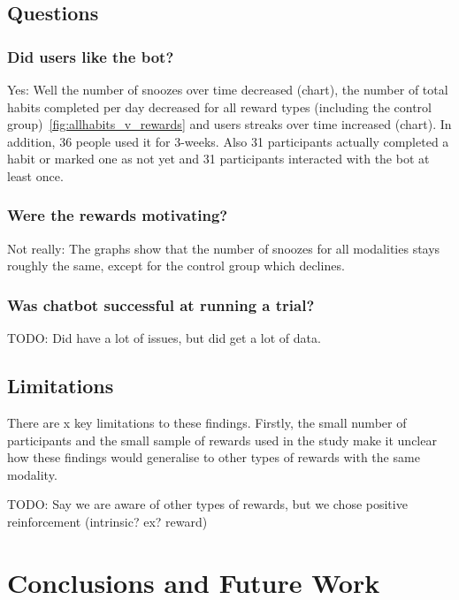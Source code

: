 \documentclass{scaffold/sigchi}
\begin{document}
\subsection{Questions}
\subsubsection{Did users like the bot?}
Yes: Well the number of snoozes over time decreased (chart), the number of total habits completed per day decreased for all reward types (including the control group)~\ref{fig:allhabits_v_rewards} and users streaks over time increased (chart). In addition, 36 people used it for 3-weeks. Also 31 participants actually completed a habit or marked one as not yet and 31 participants interacted with the bot at least once.




\subsubsection{Were the rewards motivating?}
Not really: The graphs show that the number of snoozes for all modalities stays roughly the same, except for the control group which declines.


\subsubsection{Was chatbot successful at running a trial?}
TODO: Did have a lot of issues, but did get a lot of data.


\subsection{Limitations}
There are x key limitations to these findings. Firstly, the small number of participants and the small sample of rewards used in the study make it unclear how these findings would generalise to other types of rewards with the same modality.

TODO: Say we are aware of other types of rewards, but we chose positive reinforcement (intrinsic? ex? reward)




\section{Conclusions and Future Work}

\end{document}
